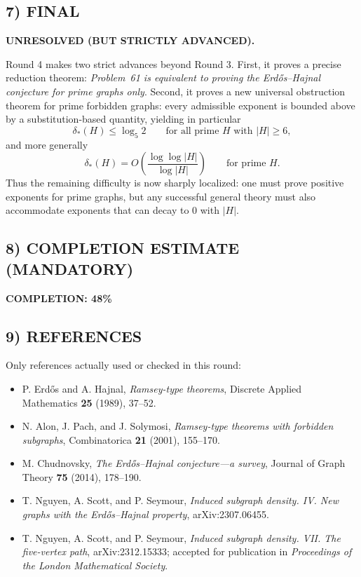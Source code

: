 \subsection*{7) FINAL}
\textbf{UNRESOLVED (BUT STRICTLY ADVANCED).}

Round 4 makes two strict advances beyond Round 3.
First, it proves a precise reduction theorem: \emph{Problem~61 is equivalent to proving the Erd\H{o}s--Hajnal conjecture for prime graphs only}.
Second, it proves a new universal obstruction theorem for prime forbidden graphs: every admissible exponent is bounded above by a substitution-based quantity, yielding in particular
\[
\delta_*(H)\le \log_5 2\qquad \text{for all prime }H\text{ with }|H|\ge 6,
\]
and more generally
\[
\delta_*(H)=O\!\left(\frac{\log\log |H|}{\log |H|}\right)
\qquad \text{for prime }H.
\]
Thus the remaining difficulty is now sharply localized: one must prove positive exponents for prime graphs, but any successful general theory must also accommodate exponents that can decay to $0$ with $|H|$.

\subsection*{8) COMPLETION ESTIMATE (MANDATORY)}
\textbf{COMPLETION: 48\%}

\subsection*{9) REFERENCES}
Only references actually used or checked in this round:
\begin{itemize}
\item P. Erd\H{o}s and A. Hajnal, \emph{Ramsey-type theorems}, Discrete Applied Mathematics \textbf{25} (1989), 37--52.
\item N. Alon, J. Pach, and J. Solymosi, \emph{Ramsey-type theorems with forbidden subgraphs}, Combinatorica \textbf{21} (2001), 155--170.
\item M. Chudnovsky, \emph{The Erd\H{o}s--Hajnal conjecture---a survey}, Journal of Graph Theory \textbf{75} (2014), 178--190.
\item T. Nguyen, A. Scott, and P. Seymour, \emph{Induced subgraph density. IV. New graphs with the Erd\H{o}s--Hajnal property}, arXiv:2307.06455.
\item T. Nguyen, A. Scott, and P. Seymour, \emph{Induced subgraph density. VII. The five-vertex path}, arXiv:2312.15333; accepted for publication in \emph{Proceedings of the London Mathematical Society}.
\end{itemize}
